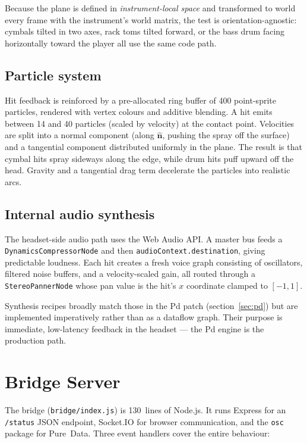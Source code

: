 \documentclass[11pt,a4paper]{article}
\begin{document}
Because the plane is defined in \emph{instrument-local space} and
transformed to world every frame with the instrument's world matrix,
the test is orientation-agnostic: cymbals tilted in two axes, rack
toms tilted forward, or the bass drum facing horizontally toward the
player all use the same code path.

\subsection{Particle system}

Hit feedback is reinforced by a pre-allocated ring buffer of 400
point-sprite particles, rendered with vertex colours and additive
blending. A hit emits between 14 and 40 particles (scaled by
velocity) at the contact point. Velocities are split into a normal
component (along $\hat{\mathbf{n}}$, pushing the spray off the
surface) and a tangential component distributed uniformly in the
plane. The result is that cymbal hits spray sideways along the
edge, while drum hits puff upward off the head. Gravity and a
tangential drag term decelerate the particles into realistic arcs.

\subsection{Internal audio synthesis}

The headset-side audio path uses the Web Audio API. A master bus
feeds a \texttt{DynamicsCompressorNode} and then
\texttt{audioContext.destination}, giving predictable loudness. Each
hit creates a fresh voice graph consisting of oscillators, filtered
noise buffers, and a velocity-scaled gain, all routed through a
\texttt{StereoPannerNode} whose pan value is the hit's $x$ coordinate
clamped to $[-1,1]$.

Synthesis recipes broadly match those in the Pd patch
(section~\ref{sec:pd}) but are implemented imperatively rather than
as a dataflow graph. Their purpose is immediate, low-latency feedback
in the headset --- the Pd engine is the production path.

\section{Bridge Server}

The bridge (\texttt{bridge/index.js}) is 130~lines of Node.js. It
runs Express for an \texttt{/status} JSON endpoint, Socket.IO for
browser communication, and the \texttt{osc} package for
Pure~Data. Three event handlers cover the entire behaviour:
\end{document}
